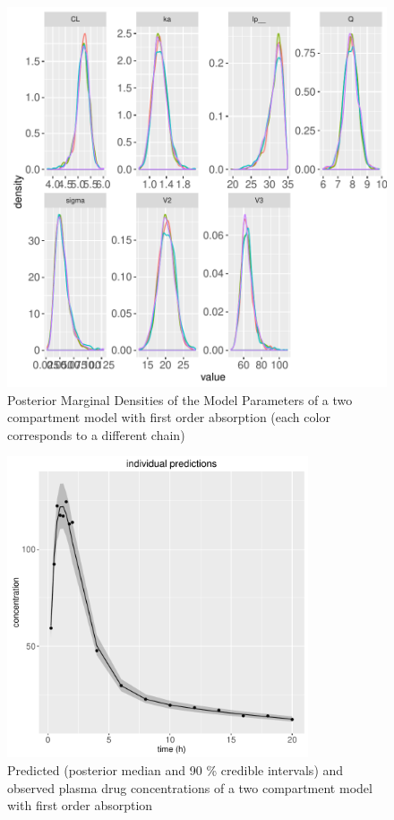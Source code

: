 \documentclass[11pt]{amsart}
\begin{document}
\begin{figure}[!htb]
\begin{center}
\includegraphics[width=4.5in,trim=0in 0in 0 0in]{graphics/TwoCptModelExamplePlots004.pdf}
\caption{{Posterior Marginal Densities of the Model Parameters of a two compartment model with first order absorption (each color corresponds to a different chain)}}
\label{TwoCptDensity}
\end{center}
\end{figure}

\begin{figure}[!htb]
\begin{center}
\includegraphics[width=3.5in,trim=0in 0in 0 0in]{graphics/TwoCptModelExamplePlots006.pdf}
\caption{{Predicted (posterior median and 90 \% credible intervals) and observed plasma drug concentrations of a two compartment model with first order absorption}}
\label{TwoCptPredictions}
\end{center}
\end{figure}
\end{document}
